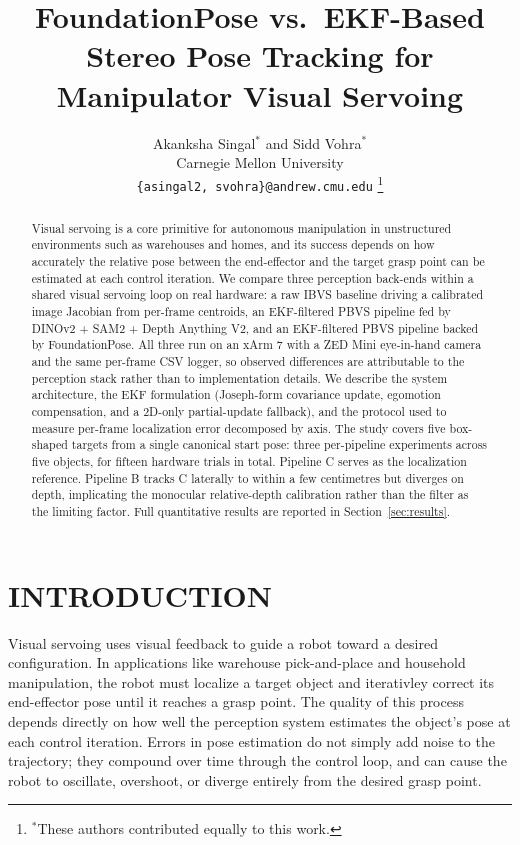 \documentclass[letterpaper, 10 pt, conference]{ieeeconf}  %
\title{\LARGE \bf
FoundationPose vs.\ EKF-Based Stereo Pose Tracking for Manipulator Visual Servoing
}
\author{Akanksha Singal$^{*}$ and Sidd Vohra$^{*}$\\
Carnegie Mellon University\\
{\tt\small \{asingal2, svohra\}@andrew.cmu.edu}%
\thanks{$^{*}$These authors contributed equally to this work.}
}
\begin{document}
\maketitle
\thispagestyle{empty}
\pagestyle{empty}

\begin{abstract}
Visual servoing is a core primitive for autonomous manipulation in unstructured environments such as warehouses and homes, and its success depends on how accurately the relative pose between the end-effector and the target grasp point can be estimated at each control iteration. We compare three perception back-ends within a shared visual servoing loop on real hardware: a raw IBVS baseline driving a calibrated image Jacobian from per-frame centroids, an EKF-filtered PBVS pipeline fed by DINOv2 + SAM2 + Depth Anything V2, and an EKF-filtered PBVS pipeline backed by FoundationPose. All three run on an xArm 7 with a ZED Mini eye-in-hand camera and the same per-frame CSV logger, so observed differences are attributable to the perception stack rather than to implementation details. We describe the system architecture, the EKF formulation (Joseph-form covariance update, egomotion compensation, and a 2D-only partial-update fallback), and the protocol used to measure per-frame localization error decomposed by axis. The study covers five box-shaped targets from a single canonical start pose: three per-pipeline experiments across five objects, for fifteen hardware trials in total. Pipeline C serves as the localization reference. Pipeline B tracks C laterally to within a few centimetres but diverges on depth, implicating the monocular relative-depth calibration rather than the filter as the limiting factor. Full quantitative results are reported in Section~\ref{sec:results}.
\end{abstract}


\section{INTRODUCTION}

Visual servoing uses visual feedback to guide a robot toward a desired configuration. In applications like warehouse pick-and-place and household manipulation, the robot must localize a target object and iterativley correct its end-effector pose until it reaches a grasp point. The quality of this process depends directly on how well the perception system estimates the object's pose at each control iteration. Errors in pose estimation do not simply add noise to the trajectory; they compound over time through the control loop, and can cause the robot to oscillate, overshoot, or diverge entirely from the desired grasp point.
\end{document}

